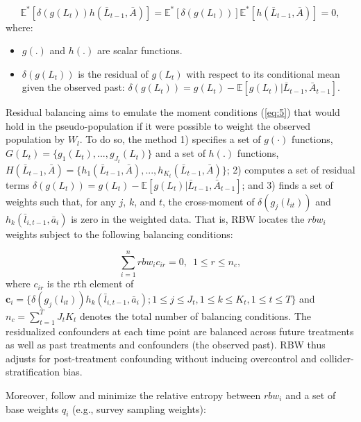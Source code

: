 \begin{equation}
\label{eq:5}
\mathbb{E}^{*}[\delta(g(L_{t}))h(\bar{L}_{t-1},\bar{A})]=\mathbb{E}^{*}[\delta(g(L_{t}))]\mathbb{E}^{*}[h(\bar{L}_{t-1},\bar{A})]=0,
\end{equation}
where:

\begin{itemize}
\tightlist
\item
  \(g(.)\) and \(h(.)\) are scalar functions.
\item
  \(\delta(g(L_{t}))\) is the residual of \(g(L_{t})\) with respect to
  its conditional mean given the observed past:
  \(\delta(g(L_{t}))=g(L_{t})-\mathbb{E}[g(L_{t})|\bar{L}_{t-1},\bar{A}_{t-1}]\).
\end{itemize}

Residual balancing aims to emulate the moment conditions (\ref{eq:5})
that would hold in the pseudo-population if it were possible to weight
the observed population by \(W_{l}\). To do so, the method 1) specifies
a set of \(g(\cdot)\) functions,
\(G(L_{t})=\{g_{1}(L_{t}),...,g_{J_{t}}(L_{t})\}\) and a set of \(h(.)\)
functions,
\(H(\bar{L}_{t-1},\bar{A})=\{h_{1}(\bar{L}_{t-1},\bar{A}),...,h_{K_{t}}(\bar{L}_{t-1},\bar{A})\}\);
2) computes a set of residual terms
\(\delta(g(L_{t}))=g(L_{t})-\mathbb{E}[g(L_{t})|\bar{L}_{t-1},\bar{A}_{t-1}]\);
and 3) finds a set of weights such that, for any \(j\), \(k\), and
\(t\), the cross-moment of \(\delta(g_{j}(l_{it}))\) and
\(h_{k}(\bar{l}_{i,t-1},\bar{a}_{i})\) is zero in the weighted data.
That is, RBW locates the \(rbw_{i}\) weights subject to the following
balancing conditions:

\begin{equation}
\label{eq:6}
\sum^{n}_{i=1}rbw_{i}c_{ir}=0, \,\,\, 1 \le r \le n_{c},
\end{equation}
where \(c_{ir}\) is the rth element of
\(\boldsymbol{c}_{i}=\{\delta(g_{j}(l_{it}))h_{k}(\bar{l}_{i,t-1},\bar{a}_{i}); 1 \le j \le J_{t}, 1 \le k \le K_{t}, 1 \le t \le T\}\)
and \(n_{c}=\sum^{T}_{t=1}J_{t}K_{t}\) denotes the total number of
balancing conditions. The residualized confounders at each time point
are balanced across future treatments as well as past treatments and
confounders (the observed past). RBW thus adjusts for post-treatment
confounding without inducing overcontrol and collider-stratification
bias.

Moreover, \citet{zhouResidualBalancingMethod2020a} follow
\citet{hainmuellerEntropyBalancingCausal2012} and minimize the relative
entropy between \(rbw_{i}\) and a set of base weights \(q_{i}\) (e.g.,
survey sampling weights):

